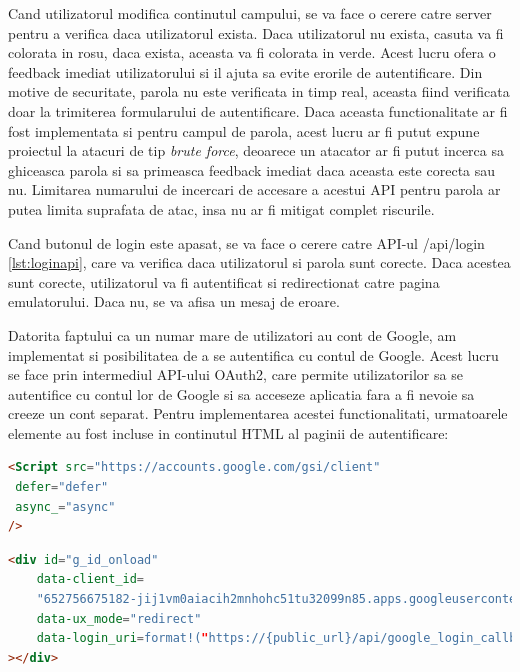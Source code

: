 \documentclass[titlepage,12pt]{article}
\DeclareRobustCommand{\code}[1]{{\ttfamily\small #1}}
\begin{document}
 Cand utilizatorul modifica continutul campului, se va face o cerere catre server pentru a verifica daca utilizatorul exista. Daca utilizatorul nu exista, casuta va fi colorata in rosu, daca exista, aceasta va fi colorata in verde. Acest lucru ofera o feedback imediat utilizatorului si il ajuta sa evite erorile de autentificare.
Din motive de securitate, parola nu este verificata in timp real, aceasta fiind verificata doar la trimiterea formularului de autentificare. Daca aceasta functionalitate ar fi fost implementata si pentru campul de parola, acest lucru ar fi putut expune proiectul la atacuri de tip \emph{brute force}, deoarece un atacator ar fi putut incerca sa ghiceasca parola si sa primeasca feedback imediat daca aceasta este corecta sau nu. Limitarea numarului de incercari de accesare a acestui API pentru parola ar putea limita suprafata de atac, insa nu ar fi mitigat complet riscurile.

Cand butonul de login este apasat, se va face o cerere catre API-ul \code{/api/login} \cref{lst:loginapi}, care va verifica daca utilizatorul si parola sunt corecte. Daca acestea sunt corecte, utilizatorul va fi autentificat si redirectionat catre pagina emulatorului. Daca nu, se va afisa un mesaj de eroare.

Datorita faptului ca un numar mare de utilizatori au cont de Google, am implementat si posibilitatea de a se autentifica cu contul de Google. Acest lucru se face prin intermediul API-ului OAuth2, care permite utilizatorilor sa se autentifice cu contul lor de Google si sa acceseze aplicatia fara a fi nevoie sa creeze un cont separat.
Pentru implementarea acestei functionalitati, urmatoarele elemente au fost incluse in continutul \code{HTML} al paginii de autentificare:
\begin{lstlisting}[language=HTML,caption={Script necesar Google OAuth2},label={lst:googleauthscript}]
<Script src="https://accounts.google.com/gsi/client"
 defer="defer"
 async_="async"
/>
\end{lstlisting}
\begin{lstlisting}[language=HTML,caption={Butonul de autentificare cu Google},label={lst:googleauthbutton}]
<div id="g_id_onload"
    data-client_id=
    "652756675182-jij1vm0aiacih2mnhohc51tu32099n85.apps.googleusercontent.com"
    data-ux_mode="redirect"
    data-login_uri=format!("https://{public_url}/api/google_login_callback")
></div>
\end{lstlisting}
\end{document}
